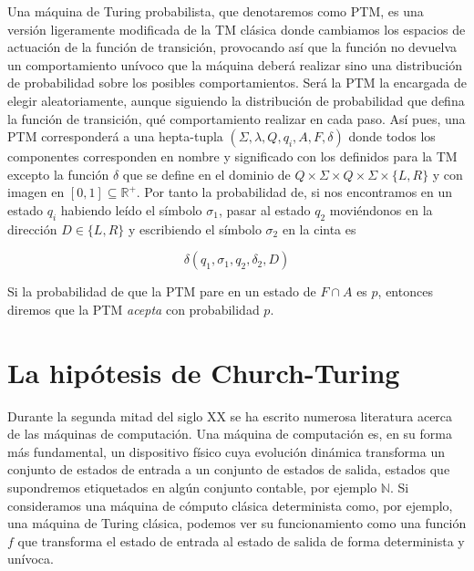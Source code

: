 \begin{defin}
Una máquina de Turing probabilista, que denotaremos como PTM, es una versión ligeramente modificada de la TM clásica donde cambiamos los espacios de actuación de la función de transición, provocando así que la función no devuelva un comportamiento unívoco que la máquina deberá realizar sino una distribución de probabilidad sobre los posibles comportamientos. Será la PTM la encargada de elegir aleatoriamente, aunque siguiendo la distribución de probabilidad que defina la función de transición, qué comportamiento realizar en cada paso. Así pues, una PTM corresponderá a una hepta-tupla $(\Sigma, \lambda, Q, q_i, A, F, \delta)$ donde todos los componentes corresponden en nombre y significado con los definidos para la TM excepto la función $\delta$ que se define en el dominio de $Q\times \Sigma \times Q \times \Sigma\times \{L,R\}$ y con imagen en $[0,1]\subseteq \mathbb{R}^+$. Por tanto la probabilidad de, si nos encontramos en un estado $q_i$ habiendo leído el símbolo $\sigma_1$, pasar al estado $q_2$ moviéndonos en la dirección $D\in\{L,R\}$ y escribiendo el símbolo $\sigma_2$ en la cinta es

\begin{equation}
\delta(q_1,\sigma_1,q_2,\delta_2,D)
\end{equation}

Si la probabilidad de que la PTM pare en un estado de $F\cap A$ es $p$, entonces diremos que la PTM \emph{acepta} con probabilidad $p$.

\end{defin}


\section{La hipótesis de Church-Turing}

Durante la segunda mitad del siglo XX se ha escrito numerosa literatura acerca de las máquinas de computación. Una máquina de computación es, en su forma más fundamental, un dispositivo físico cuya evolución dinámica transforma un conjunto de estados de entrada a un conjunto de estados de salida, estados que supondremos etiquetados en algún conjunto contable, por ejemplo $\mathbb{N}$. Si consideramos una máquina de cómputo clásica determinista como, por ejemplo, una máquina de Turing clásica, podemos ver su funcionamiento como una función $f$ que transforma el estado de entrada al estado de salida de forma determinista y unívoca.\\

